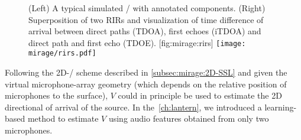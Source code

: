 \begin{figure}[t]
    \begin{sidecaption}{%
        (Left) A typical simulated \RIR/ with annotated components.
        (Right) Superposition of two RIRs and visualization of time difference
        of arrival between direct paths (\ac{TDOA}), first echoes (\ac{iTDOA}) and direct path and first echo (\ac{TDOE}).
    }[fig:mirage:rirs]
    \centering
    \texttt{[image: mirage/rirs.pdf]}
    \end{sidecaption}
\end{figure}

\mynewline
Following the 2D-\SSL/ scheme described in \cref{subsec:mirage:2D-SSL} and given the virtual microphone-array geometry (which depends on the relative position of microphones to the surface),
$V$ could in principle be used to estimate the 2D directional of arrival of the source.
In the~\cref{ch:lantern}, we introduced a learning-based method to estimate $V$ using audio features obtained from only two microphones.

